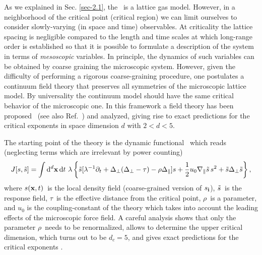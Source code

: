 \documentclass[12pt]{article}
\begin{document}
As we explained in Sec. \ref{sec-2.1}, the \dlg\ is a lattice gas
model. However, in a neighborhood of the critical
point (critical region) we can limit ourselves to consider 
slowly-varying (in space and time) observables.
At criticality the lattice spacing is
negligible compared to the length and time scales at which long-range
order is established so that it is possible to formulate a
description of the system in terms of {\it mesoscopic} variables.
In principle, the dynamics of such variables
can be obtained by coarse graining the microscopic system.
However, given the difficulty of performing a rigorous coarse-graining
procedure, one postulates a continuum field theory 
that preserves all symmetries of the microscopic lattice model. 
By universality the continuum model should have the same critical behavior 
of the microscopic one. In this 
framework a field theory has been proposed~\cite{Leung86,Janssen86a, foot2a} (see
also Ref.~\cite{Schmittmann95}) and analyzed, giving rise to exact
predictions for the critical exponents in space dimension $d$ with $2<d<5$.   

The starting point of the theory
is the dynamic functional~\cite{Janssen76,Bausch76,Janssen79} 
which reads (neglecting terms which are irrelevant by
power counting)~\cite{Janssen86a,Leung86} 
\begin{equation}
\label{thefunctional}
        J[s,\tilde{s}] = \int {\rm d}^{d}{\bf x} \, {\rm d}t \
        \lambda\left\{\tilde{s}[\lambda^{-1}\partial_{t} + \Delta_{\bot}(\Delta_{\bot} -
        {\tau}) - \rho\Delta_{\|}]s + \frac{1}{2}u_0\nabla_{\|}\tilde{s}\,s^{2} +
        \tilde{s}\Delta_{\bot}\tilde{s}\right\} ,
\end{equation}
where $s({\bf x},t)$\ is the local density field (coarse-grained
version of $s_{{\bf i}}$), $\tilde{s}$\ is the response field, $\tau$\ is the
effective distance from the critical point, $\rho$\ is a parameter, and
$u_0$ is the coupling-constant of the theory which takes into account the
leading effects of the microscopic force field. 
A careful analysis shows that only the parameter $\rho$\
needs to be renormalized, allows to determine the upper critical
dimension, which turns out to be \mbox{$d_{c}=5$}, and gives exact predictions
for the critical exponents \cite{Janssen86a,Leung86}. 
\end{document}
